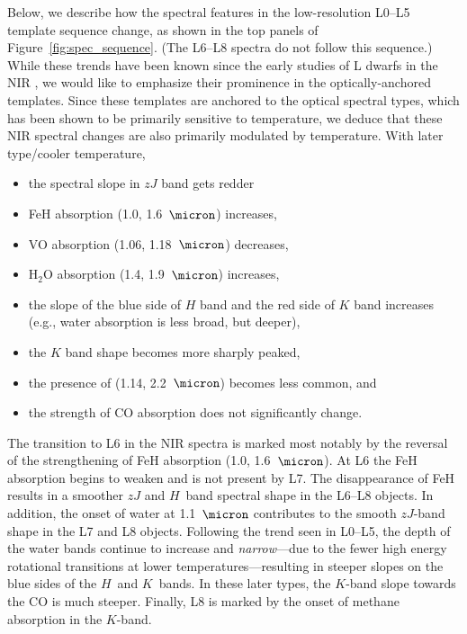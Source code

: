 \documentclass[12pt,preprint]{aastex}
\begin{document}
Below, we describe how the spectral features in the low-resolution L0--L5 template sequence change, as shown in the top panels of Figure~\ref{fig:spec_sequence}. (The L6--L8 spectra do not follow this sequence.)
While these trends have been known since the early studies of L dwarfs in the NIR \citep{Testi01,Reid01_NIR,Geballe02}, we would like to emphasize their prominence in the optically-anchored templates.
Since these templates are anchored to the optical spectral types, which has been shown to be primarily sensitive to temperature, we deduce that these NIR spectral changes are also primarily modulated by temperature.
With later type/cooler temperature,
\begin{itemize}
\item the spectral slope in $zJ$ band gets redder
\item FeH absorption (1.0, 1.6~$\micron$) increases,
\item VO absorption (1.06, 1.18~$\micron$) decreases,
\item H$_2$O absorption (1.4, 1.9~$\micron$) increases,
\item the slope of the blue side of $H$ band and the red side of $K$ band increases (e.g., water absorption is less broad, but deeper),
\item the $K$ band shape becomes more sharply peaked,
\item the presence of  (1.14, 2.2~$\micron$) becomes less common, and
\item the strength of CO absorption does not significantly change.
\end{itemize}

The transition to L6 in the NIR spectra is marked most notably by the reversal of the strengthening of FeH absorption (1.0, 1.6~$\micron$).
At L6 the FeH absorption begins to weaken and is not present by L7.
The disappearance of FeH results in a smoother $zJ$ and $H$~band spectral shape in the L6--L8 objects.
In addition, the onset of water at 1.1~$\micron$ contributes to the smooth $zJ$-band shape in the L7 and L8 objects.
Following the trend seen in L0--L5, the depth of the water bands continue to increase and \emph{narrow}---due to the fewer high energy rotational transitions at lower temperatures---resulting in steeper slopes on the blue sides of the $H$~and $K$~bands.
In these later types, the $K$-band slope towards the CO is much steeper.
Finally, L8 is marked by the onset of methane absorption in the $K$-band.
\end{document}
